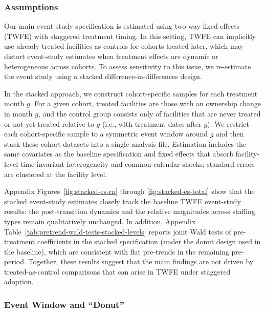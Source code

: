 \documentclass[12pt]{article}
\begin{document}
\subsubsection{Assumptions}

Our main event-study specification is estimated using two-way fixed effects (TWFE) with staggered treatment timing. In this setting, TWFE can implicitly use already-treated facilities as controls for cohorts treated later, which may distort event-study estimates when treatment effects are dynamic or heterogeneous across cohorts. To assess sensitivity to this issue, we re-estimate the event study using a stacked difference-in-differences design.

In the stacked approach, we construct cohort-specific samples for each treatment month $g$. For a given cohort, treated facilities are those with an ownership change in month $g$, and the control group consists only of facilities that are never treated or not-yet-treated relative to $g$ (i.e., with treatment dates after $g$). We restrict each cohort-specific sample to a symmetric event window around $g$ and then stack these cohort datasets into a single analysis file. Estimation includes the same covariates as the baseline specification and fixed effects that absorb facility-level time-invariant heterogeneity and common calendar shocks; standard errors are clustered at the facility level.

Appendix Figures~\ref{fig:stacked-es-rn} through \ref{fig:stacked-es-total} show that the stacked event-study estimates closely track the baseline TWFE event-study results: the post-transition dynamics and the relative magnitudes across staffing types remain qualitatively unchanged. In addition, Appendix Table~\ref{tab:pretrend-wald-tests-stacked-levels} reports joint Wald tests of pre-treatment coefficients in the stacked specification (under the donut design used in the baseline), which are consistent with flat pre-trends in the remaining pre-period. Together, these results suggest that the main findings are not driven by treated-as-control comparisons that can arise in TWFE under staggered adoption.

\subsubsection{Event Window and ``Donut''}
\end{document}
